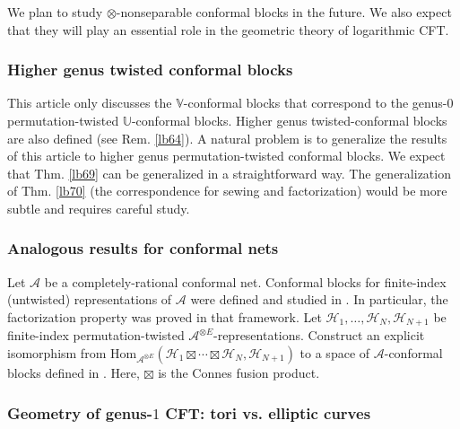 \documentclass[12pt,a4paper,notitlepage]{article}
\theoremstyle{definition}
\theoremstyle{plain}
\newcommand{\mc}{\mathcal}
\newcommand{\Hom}{\mathrm{Hom}}
\newcommand{\Vbb}{\mathbb V}
\newcommand{\Ubb}{\mathbb U}
\numberwithin{equation}{subsection}
\begin{document}
We plan to study $\otimes$-nonseparable conformal blocks in the future. We also expect that they will play an essential role in the geometric theory of logarithmic CFT.







\subsubsection*{Higher genus twisted conformal blocks}

This article only discusses the $\Vbb$-conformal blocks that correspond to the genus-$0$ permutation-twisted $\Ubb$-conformal blocks. Higher genus twisted-conformal blocks are also defined (see Rem. \ref{lb64}). A natural problem is to generalize the results of this article to higher genus permutation-twisted conformal blocks. We expect that Thm. \ref{lb69} can be generalized in a straightforward way. The generalization of Thm. \ref{lb70} (the correspondence for sewing and factorization) would be more subtle and requires careful study.


\subsubsection*{Analogous results for conformal nets}


Let $\mc A$ be a completely-rational conformal net. Conformal blocks for finite-index (untwisted) representations of $\mc A$ were defined and studied in \cite{BDH17}. In particular, the factorization property was proved in that framework. Let $\mc H_1,\dots,\mc H_N,\mc H_{N+1}$ be finite-index permutation-twisted $\mc A^{\otimes E}$-representations. Construct an explicit isomorphism from $\Hom_{\mc A^{\otimes E}}(\mc H_1\boxtimes\cdots\boxtimes\mc H_N,\mc H_{N+1})$ to a space of $\mc A$-conformal blocks defined in \cite{BDH17}. Here, $\boxtimes$ is the Connes fusion product.


\subsubsection*{Geometry of genus-$1$  CFT: tori vs. elliptic curves}
\end{document}
